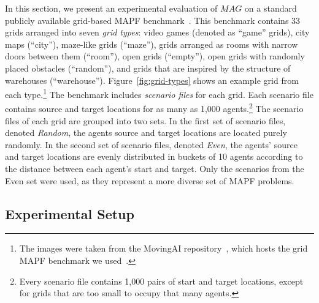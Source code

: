 \documentclass{ecai}
\newcommand{\Carmel}[1]{\textcolor{red}{\textsc{Carmel}: #1}}
\newcommand{\Roni}[1]{}
\newcommand{\mapfgas}[1]{\ensuremath{\textit{MAG}}\xspace}
\begin{document}
In this section, we present an experimental evaluation of \mapfgas\ on a standard publicly available grid-based MAPF benchmark~\cite{stern2019multi}. 
This benchmark contains 33 grids arranged into seven \emph{grid types}: video
games (denoted as ``game'' grids), city maps (``city''), maze-like
grids (``maze''), grids arranged as rooms with narrow doors
between them (``room''), open grids (``empty''), open grids with
randomly placed obstacles (``random''), and grids that are inspired by the structure of warehouses (``warehouse'').
Figure~\ref{fig:grid-types} shows an example grid from each type.\footnote{The images were taken from the MovingAI repository~\cite{sturtevant2012benchmarks}, which hosts the grid MAPF benchmark we used~\cite{stern2019multi}.}
The benchmark includes \emph{scenario files} for each grid. 
Each scenario file contains source and target locations for as many as 1,000 agents.\footnote{Every scenario file contains 1,000 pairs of start and target locations, except for grids that are too small to occupy that many agents.} %
The scenario files of each grid are grouped into two sets. 
In the first set of scenario files, denoted
\emph{Random}, 
the agents source and target locations are located
purely randomly. 
In the second set of scenario files, denoted
\emph{Even}, the agents’ source and target locations are evenly distributed in buckets of 10 agents according to the distance between each agent's start and target. 
Only the scenarios from the Even set were used, as they represent a more diverse set of MAPF problems. 

\subsection{Experimental Setup}
\end{document}
